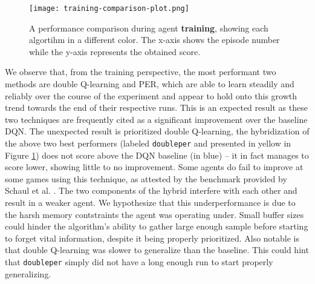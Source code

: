 \begin{figure}[h]
    \centering
    \texttt{[image: training-comparison-plot.png]}
    \caption{A performance comparison during agent \textbf{training}, showing each algortihm in a different color. The x-axis shows the episode number while the y-axis represents the obtained score.}
    \label{fig:training-results}
\end{figure}

We observe that, from the training perspective, the most performant two methods are double Q-learning and PER, which are able to learn steadily and reliably over the course of the experiment and appear to hold onto this growth trend towards the end of their respective runs.
This is an expected result as these two techniques are frequently cited as a significant improvement over the baseline DQN.
The unexpected result is prioritized double Q-learning, the hybridization of the above two best performers (labeled \texttt{doubleper} and presented in yellow in Figure \ref{fig:training-results}) does not score above the DQN baseline (in blue) -- it in fact manages to score lower, showing little to no improvement.
Some agents do fail to improve at some games using this technique, as attested by the benchmark provided by Schaul et al. \cite{per-paper}.
The two components of the hybrid interfere with each other and result in a weaker agent.
We hypothesize that this underperformance is due to the harsh memory contstraints the agent was operating under.
Small buffer sizes could hinder the algorithm's ability to gather large enough sample before starting to forget vital information, despite it being properly prioritized.
Also notable is that double Q-learning was slower to generalize than the baseline.
This could hint that \texttt{doubleper} simply did not have a long enough run to start properly generalizing.


